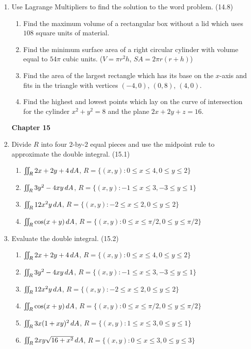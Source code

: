 \begin{enumerate}
    \item Use Lagrange Multipliers to find the solution to the word problem. (14.8)

      \begin{enumerate}
        \item Find the maximum volume of a rectangular box without a lid which uses $108$ square units of material.
        \item Find the minimum surface area of a right circular cylinder with volume equal to $54\pi$ cubic units. ($V=\pi r^2h$, $SA=2\pi r(r+h)$)
        \item Find the area of the largest rectangle which has its base on the $x$-axis and fits in the triangle with vertices $(-4,0)$, $(0,8)$, $(4,0)$.
        \item Find the highest and lowest points which lay on the curve of intersection for the cylinder $x^2+y^2=8$ and the plane $2x+2y+z=16$.
      \end{enumerate}

\newpage
\centerline{\bf Chapter 15}

    \item Divide $R$ into four $2$-by-$2$ equal pieces and use the midpoint rule to approximate the double integral. (15.1)

      \begin{enumerate}
        \item $\iint_R 2x+2y+4 \,d{A}$, $R = \{(x,y) : 0\leq x\leq 4, 0\leq y\leq 2\}$
        \item $\iint_R 3y^2-4xy\,d{A}$, $R = \{(x,y) : -1\leq x\leq 3, -3\leq y\leq 1\}$
        \item $\iint_R 12x^2y\,d{A}$, $R = \{ (x,y) : -2\leq x\leq 2, 0\leq y\leq 2\}$
        \item $\iint_R \cos(x+y)\,d{A}$, $R = \{ (x,y) : 0\leq x\leq \pi/2, 0\leq y\leq \pi/2\}$
      \end{enumerate}

    \item Evaluate the double integral. (15.2)

      \begin{enumerate}
        \item $\iint_R 2x+2y+4 \,d{A}$, $R = \{(x,y) : 0\leq x\leq 4, 0\leq y\leq 2\}$
        \item $\iint_R 3y^2-4xy\,d{A}$, $R = \{(x,y) : -1\leq x\leq 3, -3\leq y\leq 1\}$
        \item $\iint_R 12x^2y\,d{A}$, $R = \{ (x,y) : -2\leq x\leq 2, 0\leq y\leq 2\}$
        \item $\iint_R \cos(x+y)\,d{A}$, $R = \{ (x,y) : 0\leq x\leq \pi/2, 0\leq y\leq \pi/2\}$
        \item $\iint_R 3x(1+xy)^2\,d{A}$, $R = \{ (x,y) : 1\leq x\leq 3, 0\leq y\leq 1 \}$
        \item $\iint_R 2xy\sqrt{16+x^2}\,d{A}$, $R = \{ (x,y): 0\leq x\leq 3, 0\leq y\leq 3 \}$ 
      \end{enumerate}


\end{enumerate}
